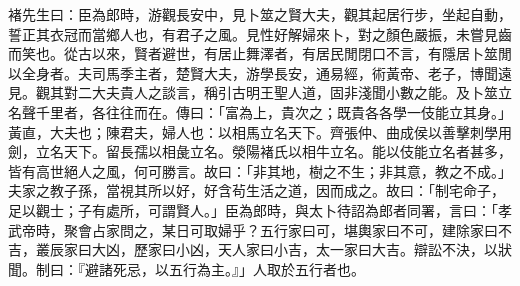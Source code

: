 \begin{pinyinscope}
褚先生曰：臣為郎時，游觀長安中，見卜筮之賢大夫，觀其起居行步，坐起自動，誓正其衣冠而當鄉人也，有君子之風。見性好解婦來卜，對之顏色嚴振，未嘗見齒而笑也。從古以來，賢者避世，有居止舞澤者，有居民閒閉口不言，有隱居卜筮閒以全身者。夫司馬季主者，楚賢大夫，游學長安，通易經，術黃帝、老子，博聞遠見。觀其對二大夫貴人之談言，稱引古明王聖人道，固非淺聞小數之能。及卜筮立名聲千里者，各往往而在。傳曰：「富為上，貴次之；既貴各各學一伎能立其身。」黃直，大夫也；陳君夫，婦人也：以相馬立名天下。齊張仲、曲成侯以善擊刺學用劍，立名天下。留長孺以相彘立名。滎陽褚氏以相牛立名。能以伎能立名者甚多，皆有高世絕人之風，何可勝言。故曰：「非其地，樹之不生；非其意，教之不成。」夫家之教子孫，當視其所以好，好含茍生活之道，因而成之。故曰：「制宅命子，足以觀士；子有處所，可謂賢人。」臣為郎時，與太卜待詔為郎者同署，言曰：「孝武帝時，聚會占家問之，某日可取婦乎？五行家曰可，堪輿家曰不可，建除家曰不吉，叢辰家曰大凶，歷家曰小凶，天人家曰小吉，太一家曰大吉。辯訟不決，以狀聞。制曰：『避諸死忌，以五行為主。』」人取於五行者也。


\end{pinyinscope}